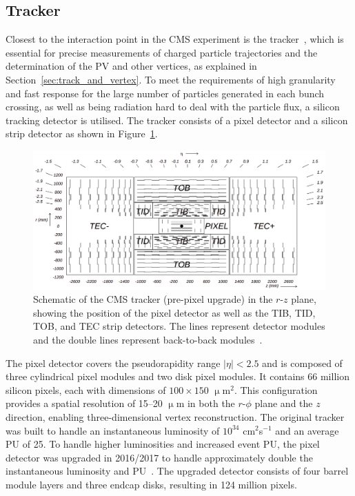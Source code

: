 \subsection{Tracker}

Closest to the interaction point in the \ac{CMS} experiment is the tracker~\cite{CMS_Setup,Malberti:2014pda,CMS:2012sda}, which is essential for precise measurements of charged particle trajectories and the determination of the \ac{PV} and other vertices, as explained in Section~\ref{sec:track_and_vertex}. 
To meet the requirements of high granularity and fast response for the large number of particles generated in each bunch crossing, as well as being radiation hard to deal with the particle flux, a silicon tracking detector is utilised. 
The tracker consists of a pixel detector and a silicon strip detector as shown in Figure~\ref{fig:tracker}. \\

\begin{figure}[!hbtp]
    \centering
    \includegraphics[width=\textwidth]{Figures/tracker.png}
    \caption[Diagram of the CMS tracker.]{Schematic of the CMS tracker (pre-pixel upgrade) in the $r$-$z$ plane, showing the position of the pixel detector as well as the TIB, TID, TOB, and TEC strip detectors. The lines represent detector modules and the double lines represent back-to-back modules~\cite{CMS_Setup}.}
    \label{fig:tracker}
\end{figure}

The pixel detector covers the pseudorapidity range $|\eta| < 2.5$ and is composed of three cylindrical pixel modules and two disk pixel modules. 
It contains 66 million silicon pixels, each with dimensions of $100 \times 150$ $\upmu$m${^2}$. 
This configuration provides a spatial resolution of 15--20 $\upmu$m in both the $r$-$\phi$ plane and the $z$ direction, enabling three-dimensional vertex reconstruction.
The original tracker was built to handle an instantaneous luminosity of $10^{34}$ cm$^{2}$s$^{-1}$ and an average \ac{PU} of 25.
To handle higher luminosities and increased event \ac{PU}, the pixel detector was upgraded in 2016/2017 to handle approximately double the instantaneous luminosity and \ac{PU}~\cite{CMS:2012sda}. 
The upgraded detector consists of four barrel module layers and three endcap disks, resulting in 124 million pixels. \\

